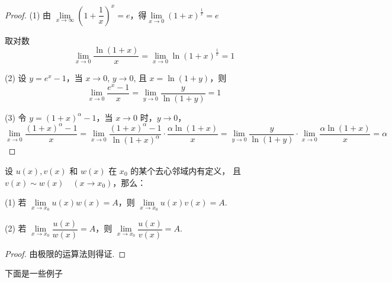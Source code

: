 \begin{proof}
	(1) 由 \(\lim\limits_{x \to \infty} (1+\dfrac{1}{x})^{x} = e\)，得\(\lim\limits_{x \to 0}(1+x)^{\frac{1}{x}}  = e\)
	
	取对数
	\[
	\lim_{x \to 0} \frac{\ln(1+x)}{x} = \lim_{x \to 0} \ln(1+x)^{\frac{1}{x}} = 1
	\]
	
	(2) 设 \( y = e^x - 1 \)，当 \( x \to 0 \), \( y \to 0 \), 且 \( x = \ln(1+y) \)，则
	\[
	\lim_{x \to 0} \frac{e^x - 1}{x} = \lim_{y \to 0} \frac{y}{\ln(1+y)} = 1
	\]
	
	(3) 令 \( y = (1+x)^\alpha - 1 \)，当 \( x \to 0 \) 时，\( y \to 0 \)，
	\[
	\lim_{x \to 0} \frac{(1+x)^\alpha - 1}{x} = \lim_{x \to 0} \frac{(1+x)^\alpha - 1}{\ln(1+x)^\alpha} \cdot \frac{\alpha \ln(1+x)}{x} = \lim_{y \to 0} \frac{y}{\ln(1+y)} \cdot \lim_{x \to 0} \frac{\alpha \ln(1+x)}{x} = \alpha
	\]
\end{proof}
\begin{proposition}
	设 \( u(x), v(x) \) 和 \( w(x) \) 在 \( x_0 \) 的某个去心邻域内有定义，
	且 \( v(x) \sim w(x) \quad (x \to x_0) \)，那么：
	
	(1) 若 \(\lim\limits_{x \to x_0} u(x) w(x) = A\)，则 \(\lim\limits_{x \to x_0} u(x) v(x) = A\).
	
	(2) 若 \(\lim\limits_{x \to x_0} \dfrac{u(x)}{w(x)} = A\)，则 \(\lim\limits_{x \to x_0} \dfrac{u(x)}{v(x)} = A\).
	
	
	
\end{proposition}
\begin{proof}
	由极限的运算法则得证.
\end{proof}
下面是一些例子

